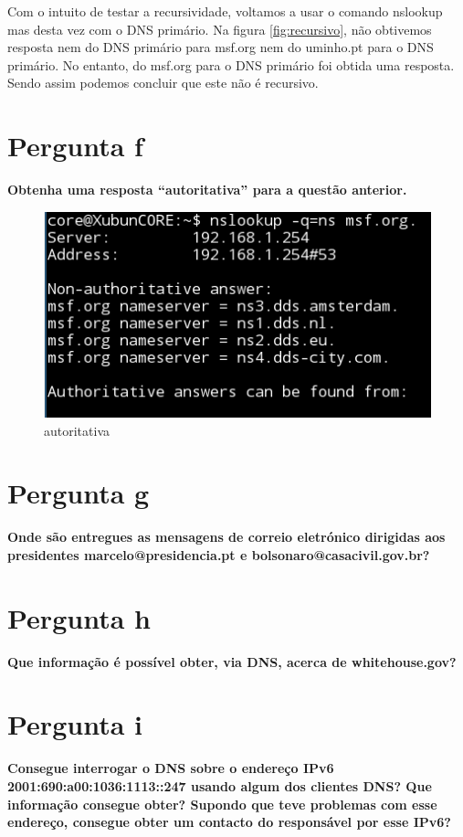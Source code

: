 \documentclass[a4paper]{report}
\begin{document}
Com o intuito de testar a recursividade, voltamos a usar o comando nslookup
mas desta vez com o DNS primário. Na figura \ref{fig:recursivo}, não obtivemos
resposta nem do DNS primário para msf.org nem do uminho.pt para o DNS primário.
No entanto, do msf.org para o DNS primário foi obtida uma resposta. Sendo assim
podemos concluir que este não é recursivo.

\section{Pergunta f}
\textbf{Obtenha uma resposta “autoritativa” para a questão anterior.}

\begin{figure}[H]
    \centering 
    \includegraphics[width=\textwidth]{images/autoritativa.png}  
    \caption{autoritativa}
    \label{fig:autoritativa}
\end{figure}

\section{Pergunta g}
\textbf{Onde são entregues as mensagens de correio eletrónico dirigidas aos
presidentes marcelo@presidencia.pt e bolsonaro@casacivil.gov.br?}

\section{Pergunta h}
\textbf{Que informação é possível obter, via DNS, acerca de whitehouse.gov?}

\section{Pergunta i}
\textbf{Consegue interrogar o DNS sobre o endereço IPv6
2001:690:a00:1036:1113::247 usando algum dos clientes DNS? Que informação
consegue obter? Supondo que teve problemas com esse endereço, consegue obter um
contacto do responsável por esse IPv6?}
\end{document}
